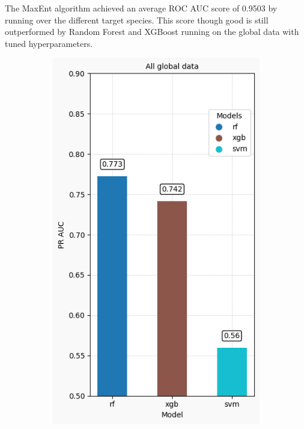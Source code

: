 \documentclass{article}
\begin{document}
The MaxEnt algorithm achieved an average ROC AUC score of 0.9503 by running over the different target species. This score though good is still outperformed by Random Forest and XGBoost running on the global data with tuned hyperparameters.
\begin{figure}[H]
    \centering
    \begin{subfigure}[b]{0.15\linewidth}  %
        \centering
        \includegraphics[width=\linewidth]{All global data.png}
        \caption{}

\end{subfigure}
\end{figure}
\end{document}
